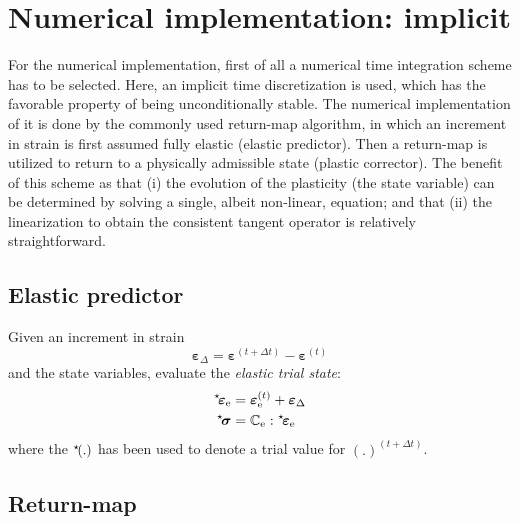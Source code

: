 \documentclass[times,namecite]{goose-article}
\newcommand\leftstar[1]{\hspace*{-.3em}~^\star\!#1}
\begin{document}
\vfill\newpage
\section{Numerical implementation: implicit}

For the numerical implementation, first of all a numerical time integration scheme has to be selected. Here, an implicit time discretization is used, which has the favorable property of being unconditionally stable. The numerical implementation of it is done by the commonly used return-map algorithm, in which an increment in strain is first assumed fully elastic (elastic predictor). Then a return-map is utilized to return to a physically admissible state (plastic corrector). The benefit of this scheme as that (i) the evolution of the plasticity (the state variable) can be determined by solving a single, albeit non-linear, equation; and that (ii) the linearization to obtain the consistent tangent operator is relatively straightforward.

\subsection{Elastic predictor}

Given an increment in strain
\begin{equation}
  \bm{\varepsilon}_\Delta = \bm{\varepsilon}^{(t + \Delta t)} - \bm{\varepsilon}^{(t)}
\end{equation}
and the state variables, evaluate the \emph{elastic trial state}:
\begin{align}
  \leftstar{\bm{\varepsilon}}_\mathrm{e}
  &=
  \bm{\varepsilon}^{(t)}_\mathrm{e} +
  \bm{\varepsilon}_\Delta
  \\
  \leftstar{\bm{\sigma}}
  &=
  \mathbb{C}_\mathrm{e} : \leftstar{\bm{\varepsilon}}_\mathrm{e}
\end{align}
where the $\leftstar{(.)}$ has been used to denote a trial value for $(.)^{(t + \Delta t)}$.

\subsection{Return-map}
\end{document}
